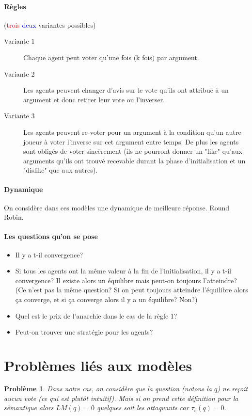 \documentclass[12pt]{article}
\theoremstyle{defi}
\theoremstyle{not}
\theoremstyle{prob}
\newtheorem{problem}{Problème}[section]
\begin{document}
  \paragraph{Règles}(\textcolor{red}{trois} \textcolor{blue}{deux} variantes possibles)
    \begin{description}
      \item[Variante 1] Chaque agent peut voter qu'une fois (k fois) par argument.

      \item[Variante 2] Les agents peuvent changer d'avis sur le vote qu'ils ont attribué à un argument et donc retirer leur vote ou l'inverser.
\color{red}
      \item[Variante 3] Les agents peuvent re-voter pour un argument à la condition qu'un autre joueur à voter l'inverse sur cet argument entre temps. De plus les agents sont obligés de voter sincèrement (ils ne pourront donner un "like" qu'aux arguments qu'ils ont trouvé recevable durant la phase d'initialisation et un "dislike" que aux autres).
\color{black}
    \end{description}

    \paragraph{Dynamique\\}
      On considère dans ces modèles une dynamique de meilleure réponse. Round Robin.

    \paragraph{Les questions qu'on se pose}
    \begin{itemize}
      \item Il y a t-il convergence?
      \item Si tous les agents ont la même valeur à la fin de l'initialisation, il y a t-il convergence? Il existe alors un équilibre mais peut-on toujours l'atteindre? (Ce n'est pas la même question? Si on peut toujours atteindre l'équilibre alors ça converge, et si ça converge alors il y a un équilibre? Non?)
      \item Quel est le prix de l'anarchie dans le cas de la règle 1?
      \item Peut-on trouver une stratégie pour les agents?
    \end{itemize}



\section{Problèmes liés aux modèles}
\begin{problem}
  Dans notre cas, on considère que la question (notons la $q$) ne reçoit aucun vote (ce qui est plutôt intuitif). Mais si on prend cette définition pour la sémantique alors $LM(q) = 0$ quelques soit les attaquants car $\tau_\varepsilon(q) = 0$.
\end{problem}
\end{document}
